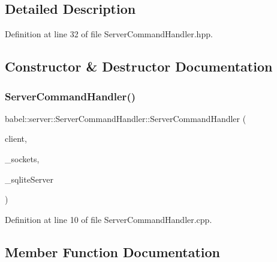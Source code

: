 \subsection{Detailed Description}


Definition at line 32 of file Server\+Command\+Handler.\+hpp.



\subsection{Constructor \& Destructor Documentation}
\mbox{\label{classbabel_1_1server_1_1_server_command_handler_aa5d9383dcd2e9a38263e3b11722a2f4a}} 
\subsubsection{\texorpdfstring{Server\+Command\+Handler()}{ServerCommandHandler()}}
{\footnotesize\ttfamily babel\+::server\+::\+Server\+Command\+Handler\+::\+Server\+Command\+Handler (\begin{DoxyParamCaption}\item[{std\+::vector$<$ \mbox{\hyperlink{classbabel_1_1common_1_1_user}{babel\+::common\+::\+User}} $>$ \&}]{client,  }\item[{std\+::vector$<$ std\+::pair$<$ \mbox{\hyperlink{classbabel_1_1server_1_1_boost_tcp_socket}{Boost\+Tcp\+Socket}} \&, int32\+\_\+t $>$$>$ \&}]{\+\_\+sockets,  }\item[{\mbox{\hyperlink{classbabel_1_1server_1_1_sqlite_server}{Sqlite\+Server}} \&}]{\+\_\+sqlite\+Server }\end{DoxyParamCaption})}



Definition at line 10 of file Server\+Command\+Handler.\+cpp.



\subsection{Member Function Documentation}
\mbox{\label{classbabel_1_1server_1_1_server_command_handler_ad6e3e8c0c7e708fae3a82553e34c6d0d}} 
